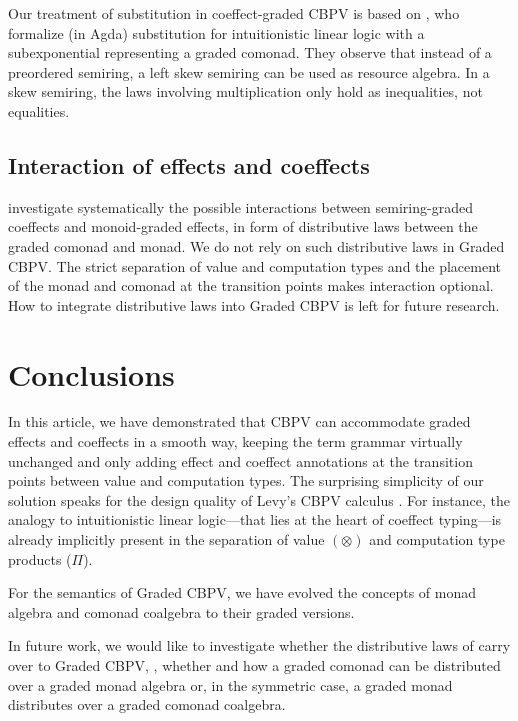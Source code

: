 \documentclass[acmsmall,review,anonymous]{acmart}\settopmatter{printfolios=true,printccs=false,printacmref=false}
\theoremstyle{remark}
\begin{document}
Our treatment of substitution in coeffect-graded CBPV is based on
\citet{woodAtkey:linearity20}, who formalize (in Agda) substitution
for intuitionistic linear logic with a subexponential representing a
graded comonad.  They observe that instead of a preordered semiring, a
left skew semiring can be used as resource algebra.  In a skew
semiring, the laws involving multiplication only hold as inequalities,
not equalities.

\subsection{Interaction of effects and coeffects}

\citet{orchard:icfp16} investigate systematically the possible
interactions between semiring-graded coeffects and monoid-graded
effects, in form of distributive laws between the graded comonad and
monad.  We do not rely on such distributive laws in Graded CBPV.  The
strict separation of value and computation types and the placement of
the monad and comonad at the transition points makes interaction
optional.  How to integrate distributive laws into Graded CBPV is left
for future research.



\section{Conclusions}

In this article, we have demonstrated that CBPV can accommodate graded
effects and coeffects in a smooth way, keeping the term grammar
virtually unchanged and only adding effect and coeffect annotations at
the transition points between value and computation types.  The
surprising simplicity of our solution speaks for the design quality of
Levy's CBPV calculus \citeyearpar{levy:hosc06}.  For instance, the analogy to
intuitionistic linear logic---that lies at the heart of coeffect
typing---is already implicitly present in the separation of value
$(\otimes)$ and computation type products ($\Pi$).

For the semantics of Graded CBPV, we have evolved the concepts of
monad algebra and comonad coalgebra to their graded versions.

In future work, we would like to investigate whether the distributive
laws of \citet{orchard:icfp16} carry over to Graded CBPV, \eg, whether
and how a graded comonad can be distributed over a graded monad
algebra or, in the symmetric case, a graded monad distributes over a
graded comonad coalgebra.
\end{document}
